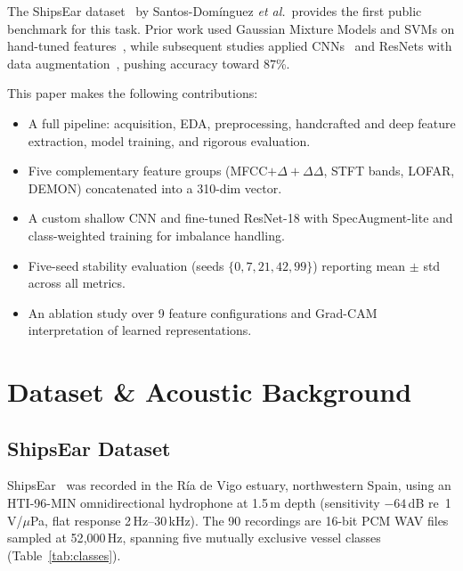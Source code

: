 \documentclass[conference]{IEEEtran}
\begin{document}
The ShipsEar dataset~\cite{shipsear2016} by Santos-Dom\'inguez \textit{et
al.}\ provides the first public benchmark for this task. Prior work used
Gaussian Mixture Models and SVMs on hand-tuned features~\cite{shipsear2016},
while subsequent studies applied CNNs~\cite{irfan2021} and ResNets with
data augmentation~\cite{xie2022}, pushing accuracy toward 87\%.

This paper makes the following contributions:
\begin{itemize}
  \item A full pipeline: acquisition, EDA, preprocessing, handcrafted and
        deep feature extraction, model training, and rigorous evaluation.
  \item Five complementary feature groups (MFCC$+\Delta+\Delta\Delta$,
        STFT bands, LOFAR, DEMON) concatenated into a 310-dim vector.
  \item A custom shallow CNN and fine-tuned ResNet-18 with SpecAugment-lite
        and class-weighted training for imbalance handling.
  \item Five-seed stability evaluation (seeds $\{0,7,21,42,99\}$) reporting
        mean $\pm$ std across all metrics.
  \item An ablation study over 9 feature configurations and Grad-CAM
        interpretation of learned representations.
\end{itemize}

\section{Dataset \& Acoustic Background}

\subsection{ShipsEar Dataset}

ShipsEar~\cite{shipsear2016} was recorded in the R\'ia de Vigo estuary,
northwestern Spain, using an HTI-96-MIN omnidirectional hydrophone at
1.5\,m depth (sensitivity $-64$\,dB re~1\,V/$\mu$Pa, flat response
2\,Hz--30\,kHz). The 90 recordings are 16-bit PCM WAV files sampled at
52{,}000\,Hz, spanning five mutually exclusive vessel classes
(Table~\ref{tab:classes}).
\end{document}
